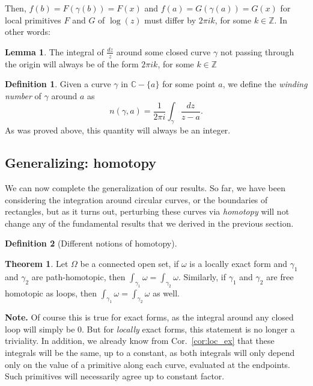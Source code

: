 \documentclass[aps,pra,showpacs,notitlepage,onecolumn,superscriptaddress,nofootinbib]{revtex4-1}
\theoremstyle{definition}
\newtheorem{definition}{Definition}[section]
\newtheorem{lemma}{Lemma}[section]
\newtheorem{theorem}{Theorem}[section]
\begin{document}
Then, $f(b) = F(\gamma(b)) = F(x)$ and $f(a) = G(\gamma(a)) = G(x)$ for local primitives $F$ and $G$ of $\log(z)$ must differ by $2 \pi i k$, for some $k \in \mathbb{Z}$. In other words:

\begin{lemma}
  The integral of $\frac{dz}{z}$ around some closed curve $\gamma$ not passing through the origin will always be of the form $2 \pi i k$, for some $k \in \mathbb{Z}$
\end{lemma}

\begin{definition}
  Given a curve $\gamma$ in $\mathbb{C} - \{a\}$ for some point $a$, we define the \emph{winding number} of $\gamma$ around $a$ as
  \begin{equation}
    n(\gamma, a) = \frac{1}{2\pi i} \displaystyle\int_{\gamma} \frac{dz}{z - a}.
  \end{equation}
  As was proved above, this quantity will always be an integer.
  \end{definition}

\subsection{Generalizing: homotopy}

\noindent We can now complete the generalization of our results. So far, we have been considering the integration around circular curves, or the boundaries of rectangles, but as it turns out,
perturbing these curves via \emph{homotopy} will not change any of the fundamental results that we derived in the previous section.

\begin{definition}[Different notions of homotopy]

  \end{definition}

\begin{theorem}
  Let $\Omega$ be a connected open set, if $\omega$ is a locally exact form and $\gamma_1$ and $\gamma_2$ are path-homotopic, then $\int_{\gamma_1} \omega = \int_{\gamma_2} \omega$.
  Similarly, if $\gamma_1$ and $\gamma_2$ are free homotopic as loops, then $\int_{\gamma_1} \omega = \int_{\gamma_2} \omega$ as well.
\end{theorem}

\noindent \textbf{Note.} Of course this is true for exact forms, as the integral around any closed loop will simply be $0$. But for \emph{locally} exact forms, this statement is
no longer a triviality. In addition, we already know from Cor.~\ref{cor:loc_ex} that these integrals will be the same, up to a constant, as both integrals will only depend only
on the value of a primitive along each curve, evaluated at the endpoints. Such primitives will necessarily agree up to constant factor.
\newline
\end{document}
